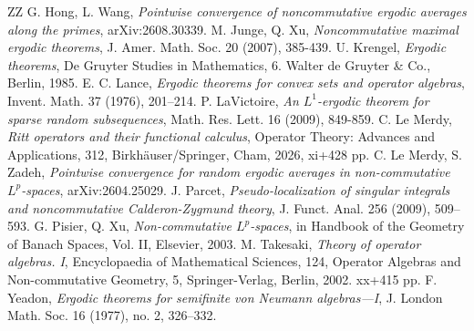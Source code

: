 \documentclass[12pt]{amsart}
\theoremstyle{remark}
\theoremstyle{definition}
\numberwithin{equation}{section}
\begin{document}
\begin{thebibliography}{ZZ}
 G. Hong, L. Wang, {\it Pointwise convergence of noncommutative ergodic averages along the primes}, arXiv:2608.30339.
 M. Junge, Q. Xu, 
{\it Noncommutative maximal ergodic theorems}, 
J. Amer. Math. Soc. 20 (2007), 385-439. 
 U. Krengel,
{\it Ergodic theorems},
De Gruyter Studies in Mathematics, 
6. Walter de Gruyter \& Co., Berlin, 1985.
 E. C. Lance,
{\it Ergodic theorems for convex sets and operator algebras}, 
Invent. Math. 37 (1976), 201–214.
 P. LaVictoire, 
{\it An $L^1$-ergodic theorem for sparse random subsequences}, 
Math. Res. Lett. 16 (2009), 849-859.
 C. Le Merdy, {\it 
Ritt operators and their functional calculus},
Operator Theory: Advances and Applications, 312,
Birkhäuser/Springer, Cham, 2026, xi+428 pp. 
 C. Le Merdy,  S. Zadeh, 
{\it Pointwise convergence for random 
ergodic averages in non-commutative $L^p$-spaces}, arXiv:2604.25029.
 J. Parcet, {\it Pseudo-localization of 
singular integrals and noncommutative Calderon-Zygmund theory}, 
J. Funct. Anal. 256 (2009), 509–593.
 G. Pisier, Q. Xu, 
{\it Non-commutative $L^p$-spaces},
in Handbook of the Geometry of Banach Spaces, Vol. II, Elsevier, 2003.
 M. Takesaki, 
{\it Theory of operator algebras. I},
Encyclopaedia of Mathematical Sciences, 124, 
Operator Algebras and Non-commutative Geometry, 5, 
Springer-Verlag, Berlin, 2002. xx+415 pp.
 F. Yeadon, 
{\it Ergodic theorems for semifinite von Neumann algebras—I},
J. London Math. Soc. 16 (1977), no. 2, 326–332.
\end{thebibliography}

\bigskip   
\end{document}

